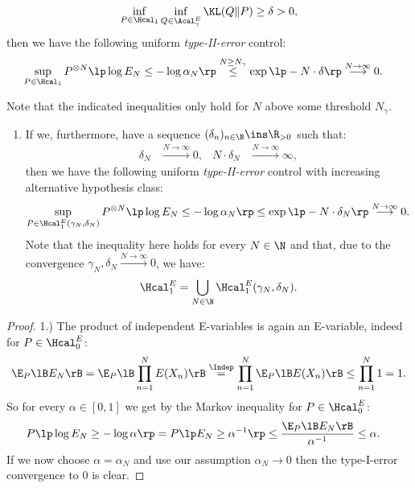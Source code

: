 \begin{Thm}
\begin{enumerate}
\begin{enumerate}
\begin{align*}
         \inf_{P \in \Hcal_1} \inf_{Q \in \Acal_{\gamma}^E} \KL(Q \|P) \ge \delta > 0,
    \end{align*}
    then we have the following uniform \emph{type-II-error} control:
 \begin{align*}
     \sup_{P \in \Hcal_1}  P^{\otimes N}\lp \log E_N \le-\log\alpha_N \rp &   \stackrel{N \ge N_\gamma}{\le} \exp\lp -N \cdot \delta \rp \stackrel{N \to \infty}{\longrightarrow} 0.
 \end{align*}
\end{enumerate}
  Note that the indicated inequalities only hold for $N$ above some threshold $N_\gamma$.
  \begin{enumerate}[resume]
      \item If we, furthermore, have a sequence $(\delta_n)_{n \in \N} \ins \R_{>0}$ such that:
         \begin{align*} 
                 \delta_N &\stackrel{N \to \infty}{\longrightarrow} 0, &N \cdot \delta_N &\stackrel{N \to \infty}{\longrightarrow} \infty, 
         \end{align*}
       then we have the following uniform \emph{type-II-error} control with increasing alternative hypothesis class:
        \begin{align*}
            \sup_{P \in \Hcal_{1}^E(\gamma_N,\delta_N)}  P^{\otimes N}\lp \log E_N \le-\log\alpha_N \rp & \le \exp\lp -N \cdot \delta_N \rp \stackrel{N \to \infty}{\longrightarrow} 0.
        \end{align*}
    Note that the inequality here holds for every $N \in \N$ and that, due to the convergence
    $\gamma_N,\delta_N \stackrel{N \to \infty}{\longrightarrow} 0$, we have: 
    \[ \Hcal^E_1 = \bigcup_{N \in \N} \Hcal_{1}^E(\gamma_N,\delta_N).\] 
 \end{enumerate}
\end{enumerate}
\begin{proof}
    1.) The product of independent E-variables is again an E-variable, indeed for $P \in \Hcal_0^E$:
     \begin{align*}
         \E_P\lB E_N \rB =  \E_P\lB \prod_{n=1}^N E(X_n) \rB \stackrel{\Indep}{=} \prod_{n=1}^N \E_P\lB E(X_n) \rB \le \prod_{n=1}^N 1 = 1. 
    \end{align*}
    So for every $\alpha \in [0,1]$ we get by the Markov inequality for $P \in \Hcal_0^E$:
    \begin{align*}
        P\lp\log E_N \ge -\log\alpha \rp & = P\lp  E_N \ge \alpha^{-1} \rp \le \frac{\E_P\lB E_N \rB}{\alpha^{-1}} \le \alpha.
    \end{align*}
    If we now choose $\alpha=\alpha_N$ and use our assumption $\alpha_N \to 0$ then the type-I-error convergence to $0$ is clear.


\end{proof}
\end{Thm}
